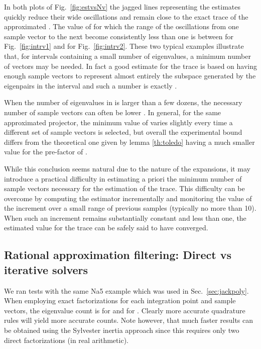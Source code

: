 \documentclass[12pt]{article}		\usepackage{tabls,multirow}
\begin{document}
In both plots of Fig.~\ref{fig:estvsNv} the jagged lines representing
the estimates quickly reduce their wide oscillations and remain close
to the exact trace of the approximated . The value of  for
which the range of the oscillations from one sample vector to the next
become consistently less than one is between 
for Fig.~\ref{fig:intrv1} and  for
Fig.~\ref{fig:intrv2}. These two typical examples illustrate that, for
intervals containing a small number of eigenvalues, a minimum number
of vectors  may be needed. In fact a good estimate
for the trace is based on having enough sample vectors  to
represent almost entirely the subspace generated by the eigenpairs in
the interval  and such a number is exactly .

When the number of eigenvalues in  is larger than a few dozens,
the necessary number of sample vectors can often be lower .  In general, for the same approximated projector,
the minimum value of  varies slightly every time a different set
of sample vectors is selected, but overall the experimental bound
differs from the theoretical one given by lemma \ref{th:toledo} having
a much smaller value for the pre-factor of .

While this conclusion seems natural due to the nature of the
expansions, it may introduce a practical difficulty in estimating a
priori the minimum number of sample vectors necessary for the
estimation of the trace. This difficulty can be overcome by computing
the estimator incrementally and monitoring the value of the increment
over a small range of previous samples (typically no more than 10).
When such an increment remains substantially constant and less than
one, the estimated value for the trace can be safely said to have
converged.


\subsection{Rational approximation filtering: Direct vs iterative solvers}
\label{sec:dvsi}
We ran tests with the same Na5 example which was used in
Sec.~\ref{sec:jackpoly}.  When employing exact factorizations for each
integration point and  sample vectors, the eigenvalue count is
 for  and  for
. Clearly more accurate quadrature rules will yield
more accurate counts.  Note however, that much faster results can be
obtained using the Sylvester inertia approach since this requires
only two direct factorizations (in real arithmetic).
\end{document}

